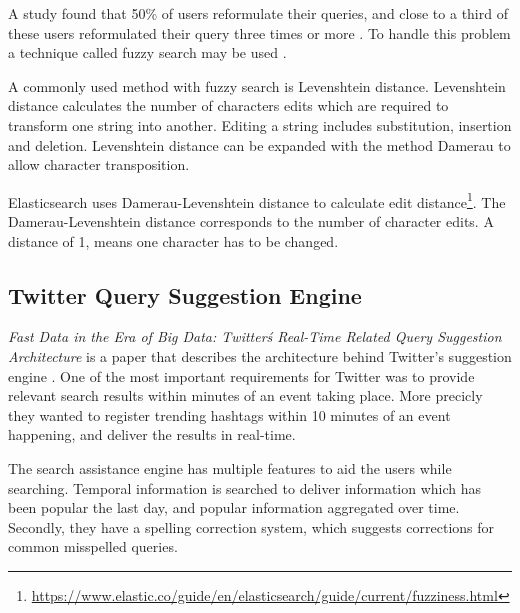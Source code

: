 A study found that 50\% of users reformulate their queries, and close to a third of these users reformulated their query three times or more \cite{query-reformulate}.
To handle this problem a technique called fuzzy search may be used \cite{fuzzy-search}.

A commonly used method with fuzzy search is Levenshtein distance.
Levenshtein distance calculates the number of characters edits which are required to transform one string into another.
Editing a string includes substitution, insertion and deletion.
Levenshtein distance can be expanded with the method Damerau to allow character transposition.

Elasticsearch uses Damerau-Levenshtein distance to calculate edit distance\footnote{\url{https://www.elastic.co/guide/en/elasticsearch/guide/current/fuzziness.html}}.
The Damerau-Levenshtein distance corresponds to the number of character edits.
A distance of 1, means one character has to be changed.

\subsection{Twitter Query Suggestion Engine}
\textit{Fast Data in the Era of Big Data: Twitter\'s Real-Time Related Query Suggestion Architecture} is a paper that describes the architecture behind Twitter's suggestion engine \cite{twitter-suggestion}.
One of the most important requirements for Twitter was to provide relevant search results within minutes of an event taking place.
More precicly they wanted to register trending hashtags within 10 minutes of an event happening, and deliver the results in real-time.

The search assistance engine has multiple features to aid the users while searching.
Temporal information is searched to deliver information which has been popular the last day, and popular information aggregated over time.
Secondly, they have a spelling correction system, which suggests corrections for common misspelled queries.
